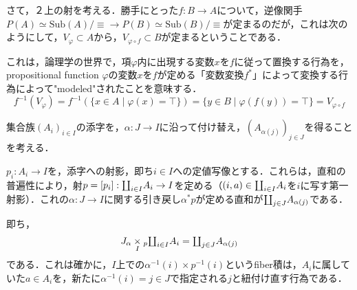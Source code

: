 \documentclass[uplatex, dvipdfmx]{jsarticle}
\begin{document}
\begin{example}
    さて，２上の射を考える．勝手にとった$f:B\to A$について，逆像関手$P(A)\simeq\mathrm{Sub}(A)/\equiv\to P(B)\simeq\mathrm{Sub}(B)/\equiv$が定まるのだが，これは次のようにして，$V_\varphi\subset A$から，$V_{\varphi\circ f}\subset B$が定まるということである．
    \begin{center}
    \end{center}
    これは，論理学の世界で，項$\varphi$内に出現する変数$x$を$f$に従って置換する行為を，propositional function $\varphi$の変数$x$を$f$が定める「変数変換$f^*$」によって変換する行為によって"modeled"されたことを意味する．
    \[ f^{-1}(V_\varphi) = f^{-1}(\{ x\in A\mid \varphi(x)=\top \}) = \{y\in B\mid \varphi(f(y))=\top\} = V_{\varphi\circ f} \]
\end{example}

\begin{example}[集合族に対する座標変換]
    集合族$(A_i)_{i\in I}$の添字を，$\alpha:J\to I$に沿って付け替え，$(A_{\alpha(j)})_{j\in J}$を得ることを考える．

    $p_i:A_i\to I$を，添字への射影，即ち$i\in I$への定値写像とする．これらは，直和の普遍性により，射$p=[p_i]:\rotatebox[origin=c]{180}{$\prod$}_{i\in I}A_i\to I$を定める（$(i,a)\in\rotatebox[origin=c]{180}{$\prod$}_{i\in I}A_i$を$i$に写す第一射影）．これの$\alpha:J\to I$に関する引き戻し$\alpha^*p$が定める直和が$\rotatebox[origin=c]{180}{$\prod$}_{j\in J}A_{\alpha(j)}$である．
    \begin{center}
    \end{center}
    即ち，
    \[ J_\alpha\underset{I}{\times}{}_p\rotatebox[origin=c]{180}{$\prod$}_{i\in I}A_i = \rotatebox[origin=c]{180}{$\prod$}_{j\in J}A_{\alpha(j)} \]
    である．これは確かに，$I$上での$\alpha^{-1}(i)\times p^{-1}(i)$というfiber積は，$A_i$に属していた$a\in A_i$を，新たに$\alpha^{-1}(i)=j\in J$で指定される$j$と紐付け直す行為である．
\end{example}
\end{document}
